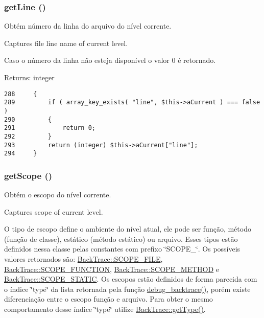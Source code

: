 \hypertarget{class_back_trace_ef9c32f6066788a101028a1d4150f8cb}{
\subsubsection[{getLine}]{\setlength{\rightskip}{0pt plus 5cm}getLine ()}}
\label{class_back_trace_ef9c32f6066788a101028a1d4150f8cb}


Obtém número da linha do arquivo do nível corrente.

Captures file line name of current level.

Caso o número da linha não esteja disponível o valor 0 é retornado.

\begin{Desc}
\item[Returns:]integer \end{Desc}


\begin{Code}\begin{verbatim}288     {
289         if ( array_key_exists( "line", $this->aCurrent ) === false )
290         {
291             return 0;
292         }
293         return (integer) $this->aCurrent["line"];
294     }
\end{verbatim}
\end{Code}


\hypertarget{class_back_trace_0dce4e854dda57ffc316fd755df9b309}{
\subsubsection[{getScope}]{\setlength{\rightskip}{0pt plus 5cm}getScope ()}}
\label{class_back_trace_0dce4e854dda57ffc316fd755df9b309}


Obtém o escopo do nível corrente.

Captures scope of current level.

O tipo de escopo define o ambiente do nível atual, ele pode ser função, método (função de classe), estático (método estático) ou arquivo. Esses tipos estão definidos nessa classe pelas constantes com prefixo \char`\"{}SCOPE\_\-\char`\"{}. Os possíveis valores retornados são: \hyperlink{class_back_trace_41001bb7178dc4a269ad6bebebc88da1}{BackTrace::SCOPE\_\-FILE}, \hyperlink{class_back_trace_eea61035bd38b8bdc6b3abc4e387d98f}{BackTrace::SCOPE\_\-FUNCTION}, \hyperlink{class_back_trace_32fd91e8f98ebf2cd2370c1919be0b0d}{BackTrace::SCOPE\_\-METHOD} e \hyperlink{class_back_trace_096359905e9cd5f803f8414eea1a713b}{BackTrace::SCOPE\_\-STATIC}. Os escopos estão definidos de forma parecida com o índice \char`\"{}type\char`\"{} da lista retornada pela função \hyperlink{}{debug\_\-backtrace()}, porém existe diferenciação entre o escopo função e arquivo. Para obter o mesmo comportamento desse índice \char`\"{}type\char`\"{} utilize \hyperlink{class_back_trace_830b5c75df72b32396701bc563fbe3c7}{BackTrace::getType()}.


